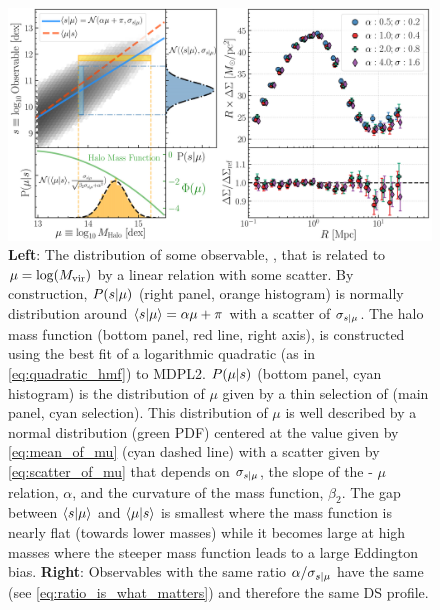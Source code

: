 \documentclass[a4paper,fleqn,usenatbib]{mnras}
\begin{document}
\begin{figure}
  \includegraphics[width=\textwidth]{figure/theory.png}
  \caption{
     \textbf{Left}: The distribution of some observable, \obsSym{}, that is related to $\mu =
     \log(M_{\rm vir})$ by a linear relation with some scatter. By construction, $P(s | \mu)$
     (right panel, orange histogram) is normally distribution around $\langle s | \mu
     \rangle = \alpha \mu + \pi$ with a scatter of $\sigma_{s | \mu}$. The halo mass
     function (bottom panel, red line, right axis), is constructed using the best fit of a
     logarithmic quadratic (as in \ref{eq:quadratic_hmf}) to MDPL2. $P(\mu | s)$ (bottom
     panel, cyan histogram) is the distribution of $\mu$ given by a thin selection of \obsSym{}
     (main panel, cyan selection). This distribution of $\mu$ is well described by a normal
     distribution (green PDF) centered at the value given by \ref{eq:mean_of_mu} (cyan dashed
     line) with a scatter given by \ref{eq:scatter_of_mu} that depends on $\sigma_{s |
     \mu}$, the slope of the \obsSym - $\mu$ relation, $\alpha$, and the curvature of the mass
     function, $\beta_2$. The gap between $\langle s | \mu \rangle$ and $\langle \mu |
     s \rangle$ is smallest where the mass function is nearly flat (towards lower masses)
     while it becomes large at high masses where the steeper mass function leads to a large
     Eddington bias. \textbf{Right}: Observables with the same ratio $\alpha /
     \sigma_{s{} | \mu{}}$ have the same \scatterMhaloObsSym{} (see
     \ref{eq:ratio_is_what_matters}) and therefore the same DS profile.
	}
    \label{fig:theory}
\end{figure}
\end{document}
